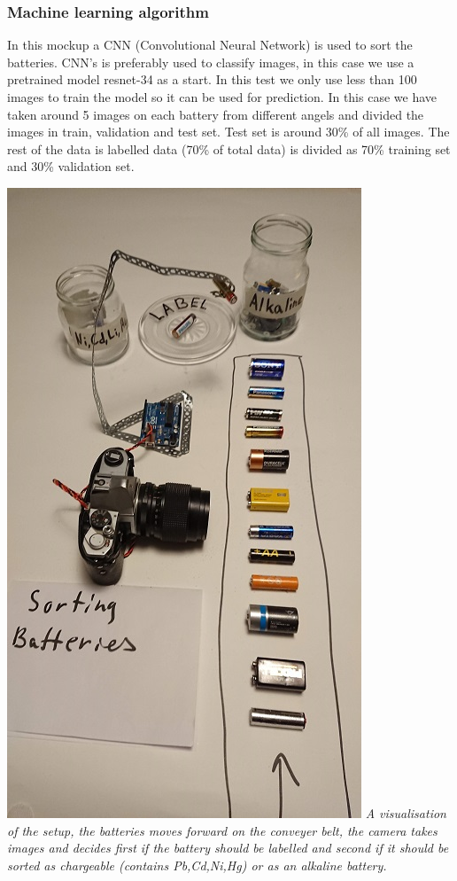 \documentclass[11pt]{article}
\makeatletter
\def\maxwidth{\ifdim\Gin@nat@width>\linewidth\linewidth
    \else\Gin@nat@width\fi}
\let\Oldincludegraphics\includegraphics
\renewcommand{\includegraphics}[1]{\Oldincludegraphics[width=.8\maxwidth]{#1}}
\makeatother
\begin{document}
\hypertarget{machine-learning-algorithm}{%
\subsubsection{Machine learning
algorithm}\label{machine-learning-algorithm}}

In this mockup a CNN (Convolutional Neural Network) is used to sort the
batteries. CNN's is preferably used to classify images, in this case we
use a pretrained model resnet-34 as a start. In this test we only use
less than 100 images to train the model so it can be used for
prediction. In this case we have taken around 5 images on each battery
from different angels and divided the images in train, validation and
test set. Test set is around 30\% of all images. The rest of the data is
labelled data (70\% of total data) is divided as 70\% training set and
30\% validation set.

\includegraphics{images/setup.jpg} \emph{A visualisation of the setup,
the batteries moves forward on the conveyer belt, the camera takes
images and decides first if the battery should be labelled and second if
it should be sorted as chargeable (contains Pb,Cd,Ni,Hg) or as an
alkaline battery.}
\end{document}
